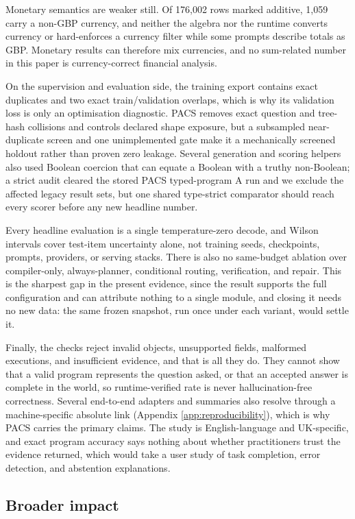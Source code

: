 Monetary semantics are weaker still.  Of 176,002 rows marked additive, 1,059 carry a non-GBP
currency, and neither the algebra nor the runtime converts currency or hard-enforces a currency
filter while some prompts describe totals as GBP.  Monetary results can therefore mix currencies,
and no sum-related number in this paper is currency-correct financial analysis.

On the supervision and evaluation side, the training export contains exact duplicates and two
exact train/validation overlaps, which is why its validation loss is only an optimisation
diagnostic.  PACS removes exact question and tree-hash collisions and controls declared shape
exposure, but a subsampled near-duplicate screen and one unimplemented gate make it a
mechanically screened holdout rather than proven zero leakage.  Several generation and scoring
helpers also used Boolean coercion that can equate a Boolean with a truthy non-Boolean; a strict
audit cleared the stored PACS typed-program A run and we exclude the affected legacy result sets,
but one shared type-strict comparator should reach every scorer before any new headline number.

Every headline evaluation is a single temperature-zero decode, and Wilson intervals cover
test-item uncertainty alone, not training seeds, checkpoints, prompts, providers, or serving
stacks.  There is also no same-budget ablation over compiler-only, always-planner, conditional
routing, verification, and repair.  This is the sharpest gap in the present evidence, since the
result supports the full configuration and can attribute nothing to a single module, and closing
it needs no new data: the same frozen snapshot, run once under each variant, would settle it.

Finally, the checks reject invalid objects, unsupported fields, malformed executions, and
insufficient evidence, and that is all they do.  They cannot show that a valid program represents
the question asked, or that an accepted answer is complete in the world, so runtime-verified rate
is never hallucination-free correctness.  Several end-to-end adapters and summaries also resolve
through a machine-specific absolute link (Appendix \ref{app:reproducibility}), which is why PACS
carries the primary claims.  The study is English-language and UK-specific, and exact program
accuracy says nothing about whether practitioners trust the evidence returned, which would take a
user study of task completion, error detection, and abstention explanations.

\subsection{Broader impact}

